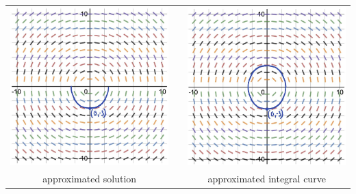 \begin{example}
\setlength{\len}{175pt}
\begin{center}
\begin{tabular}{ccc}
\includegraphics*[width=\len]{images/module9-slopefield-ex1-sol.jpg}
 & & 
\includegraphics*[width=\len]{images/module9-slopefield-ex1-intcurve.jpg}\\
approximated solution & & approximated integral curve
\end{tabular}
\end{center}


\end{example}
